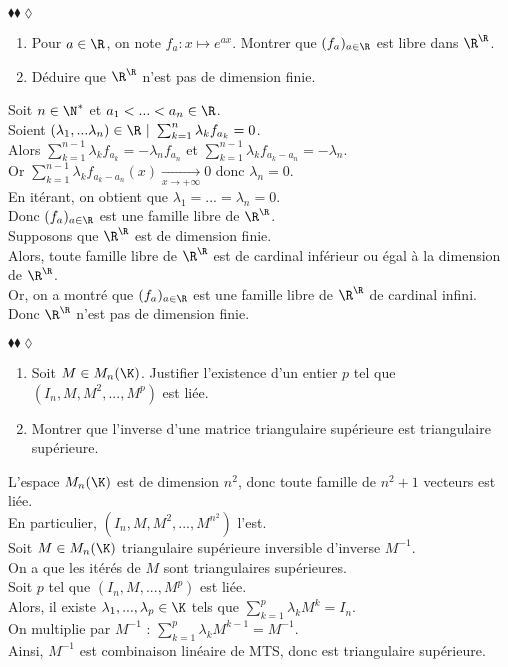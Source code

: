 \documentclass[11pt]{article}
\begin{document}
\begin{exercice}{$\blacklozenge\blacklozenge\lozenge$}{}
    \begin{enumerate}
        \item Pour $a \in \R$, on note $f_a : x \mapsto e^{ax}$. Montrer que $(f_a)_{a\in\R}$ est libre dans $\R^\R$.
        \item Déduire que $\R^\R$ n'est pas de dimension finie.
    \end{enumerate}
    \tcblower
     Soit $n \in \N^*$ et $a_1 < ... < a_n \in \R$.\\
    Soient $(\lambda_1, ... \lambda_n) \in \R ~ | ~ \sum_{k=1}^n\lambda_k f_{a_k} = 0$.\\
    Alors $\sum_{k=1}^{n-1}\lambda_k f_{a_k} = - \lambda_n f_{a_n}$ et $\sum_{k=1}^{n-1}\lambda_k f_{a_k - a_n} = - \lambda_n$.\\
    Or $\sum_{k=1}^{n-1}\lambda_k f_{a_k - a_n}(x) \xrightarrow[x\to+\infty]{} 0$ donc $\lambda_n = 0$.\\
    En itérant, on obtient que $\lambda_1 = ... = \lambda_n = 0$.\\
    Donc $(f_a)_{a\in\R}$ est une famille libre de $\R^\R$.\\[0.2cm]
     Supposons que $\R^\R$ est de dimension finie.\\
    Alors, toute famille libre de $\R^\R$ est de cardinal inférieur ou égal à la dimension de $\R^\R$.\\
    Or, on a montré que $(f_a)_{a\in\R}$ est une famille libre de $\R^\R$ de cardinal infini.\\
    Donc $\R^\R$ n'est pas de dimension finie.
\end{exercice}

\begin{exercice}{$\blacklozenge\blacklozenge\lozenge$}{}
    \begin{enumerate}
        \item Soit $M \in M_n(\K)$. Justifier l'existence d'un entier $p$ tel que $(I_n, M, M^2, ..., M^p)$ est liée.
        \item Montrer que l'inverse d'une matrice triangulaire supérieure est triangulaire supérieure.
    \end{enumerate}
    \tcblower
     L'espace $M_n(\K)$ est de dimension $n^2$, donc toute famille de $n^2+1$ vecteurs est liée.\\
    En particulier, $(I_n, M, M^2, ..., M^{n^2})$ l'est.\\[0.2cm]
     Soit $M \in M_n(\K)$ triangulaire supérieure inversible d'inverse $M^{-1}$.\\
    On a que les itérés de $M$ sont triangulaires supérieures.\\
    Soit $p$ tel que $(I_n, M, ..., M^p)$ est liée.\\
    Alors, il existe $\lambda_1, ..., \lambda_p \in \K$ tels que $\sum_{k=1}^p\lambda_k M^k = I_n$.\\
    On multiplie par $M^{-1}$ : $\sum_{k=1}^p\lambda_k M^{k-1} = M^{-1}$.\\
    Ainsi, $M^{-1}$ est combinaison linéaire de MTS, donc est triangulaire supérieure.
\end{exercice}
\end{document}
